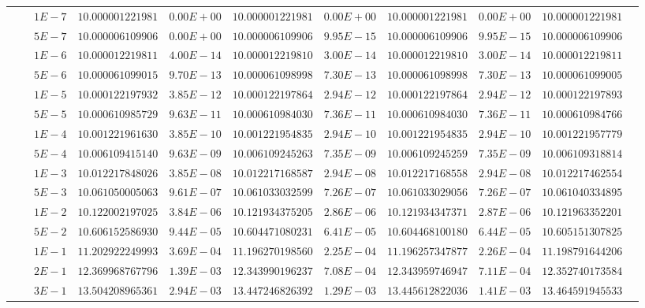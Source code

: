 \begin{landscape}
\begin{table}[ht]
{\begin{tabular}[c]{c|c|c|c|c|c|c|c|c|c|c}
& &$1E-7$ & $10.000001221981$ & $0.00E+00$ & $10.000001221981$ & $0.00E+00$ & $10.000001221981$ & $0.00E+00$ & $10.000001221981$ &  \\
& &$5E-7$ & $10.000006109906$ & $0.00E+00$ & $10.000006109906$ & $9.95E-15$ & $10.000006109906$ & $9.95E-15$ & $10.000006109906$ &  \\
& &$1E-6$ & $10.000012219811$ & $4.00E-14$ & $10.000012219810$ & $3.00E-14$ & $10.000012219810$ & $3.00E-14$ & $10.000012219811$ &  \\
& &$5E-6$ & $10.000061099015$ & $9.70E-13$ & $10.000061098998$ & $7.30E-13$ & $10.000061098998$ & $7.30E-13$ & $10.000061099005$ &  \\
& &$1E-5$ & $10.000122197932$ & $3.85E-12$ & $10.000122197864$ & $2.94E-12$ & $10.000122197864$ & $2.94E-12$ & $10.000122197893$ &  \\
& &$5E-5$ & $10.000610985729$ & $9.63E-11$ & $10.000610984030$ & $7.36E-11$ & $10.000610984030$ & $7.36E-11$ & $10.000610984766$ &  \\
& &$1E-4$ & $10.001221961630$ & $3.85E-10$ & $10.001221954835$ & $2.94E-10$ & $10.001221954835$ & $2.94E-10$ & $10.001221957779$ &  \\
& &$5E-4$ & $10.006109415140$ & $9.63E-09$ & $10.006109245263$ & $7.35E-09$ & $10.006109245259$ & $7.35E-09$ & $10.006109318814$ &  \\
& &$1E-3$ & $10.012217848026$ & $3.85E-08$ & $10.012217168587$ & $2.94E-08$ & $10.012217168558$ & $2.94E-08$ & $10.012217462554$ &  \\
& &$5E-3$ & $10.061050005063$ & $9.61E-07$ & $10.061033032599$ & $7.26E-07$ & $10.061033029056$ & $7.26E-07$ & $10.061040334895$ &  \\
& &$1E-2$ & $10.122002197025$ & $3.84E-06$ & $10.121934375205$ & $2.86E-06$ & $10.121934347371$ & $2.87E-06$ & $10.121963352201$ &  \\
& &$5E-2$ & $10.606152586930$ & $9.44E-05$ & $10.604471080231$ & $6.41E-05$ & $10.604468100180$ & $6.44E-05$ & $10.605151307825$ &  \\
& &$1E-1$ & $11.202922249993$ & $3.69E-04$ & $11.196270198560$ & $2.25E-04$ & $11.196257347877$ & $2.26E-04$ & $11.198791644206$ &  \\
& &$2E-1$ & $12.369968767796$ & $1.39E-03$ & $12.343990196237$ & $7.08E-04$ & $12.343959746947$ & $7.11E-04$ & $12.352740173584$ &  \\
& &$3E-1$ & $13.504208965361$ & $2.94E-03$ & $13.447246826392$ & $1.29E-03$ & $13.445612822036$ & $1.41E-03$ & $13.464591945533$ &  \\

\end{tabular}}
\end{table}
\end{landscape}
